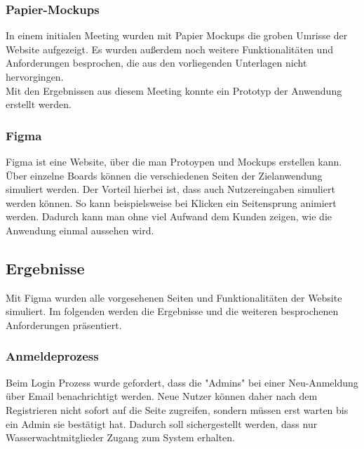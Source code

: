 \documentclass[fontsize=12pt,openright,oneside,paper=a4,BCOR=1cm]{scrbook}
\begin{document}
\subsubsection{Papier-Mockups}
In einem initialen Meeting wurden mit Papier Mockups die groben Umrisse der Website aufgezeigt. Es wurden außerdem noch weitere Funktionalitäten und Anforderungen besprochen, die aus den vorliegenden Unterlagen nicht hervorgingen. \\
Mit den Ergebnissen aus diesem Meeting konnte ein Prototyp der Anwendung erstellt werden.


\subsubsection{Figma}
Figma ist eine Website, über die man Protoypen und Mockups erstellen kann. Über einzelne Boards können die verschiedenen Seiten der Zielanwendung simuliert werden. Der Vorteil hierbei ist, dass auch Nutzereingaben simuliert werden können. So kann beispielsweise bei Klicken ein Seitensprung animiert werden. Dadurch kann man ohne viel Aufwand dem Kunden zeigen, wie die Anwendung einmal aussehen wird. 

\subsection{Ergebnisse}
Mit Figma wurden alle vorgesehenen Seiten und Funktionalitäten der Website simuliert. Im folgenden werden die Ergebnisse und die weiteren besprochenen Anforderungen präsentiert. \\

\subsubsection{Anmeldeprozess}

Beim Login Prozess wurde gefordert, dass die "Admins" bei einer Neu-Anmeldung über Email benachrichtigt werden. Neue Nutzer können daher nach dem Registrieren nicht sofort auf die Seite zugreifen, sondern müssen erst warten bis ein Admin sie bestätigt hat. Dadurch soll sichergestellt werden, dass nur Wasserwachtmitglieder Zugang zum System erhalten.\\
\end{document}
